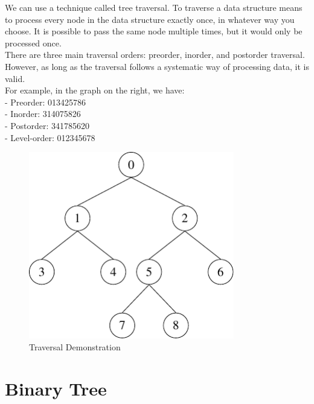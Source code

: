 \begin{minipage}{0.6\textwidth}
We can use a technique called tree traversal. To traverse a data structure means to process every node in the data structure exactly once, in whatever way you choose. It is possible to pass the same node multiple times, but it would only be processed once.\\[3pt]
There are three main traversal orders: preorder, inorder, and postorder traversal. However, as long as the traversal follows a systematic way of processing data, it is valid.\\[3pt]
For example, in the graph on the right, we have:\\[3pt]
- Preorder: 013425786  \\[3pt]
- Inorder: 314075826  \\[3pt]
- Postorder: 341785620  \\[3pt]
- Level-order: 012345678
\end{minipage}
\begin{minipage}{0.4\textwidth}
\begin{figure}[H]
  \centering
  \includegraphics[width=0.8\textwidth]{Figure/Traversal.pdf}
  \caption{Traversal Demonstration}
\end{figure}
\end{minipage}

\section{Binary Tree}
